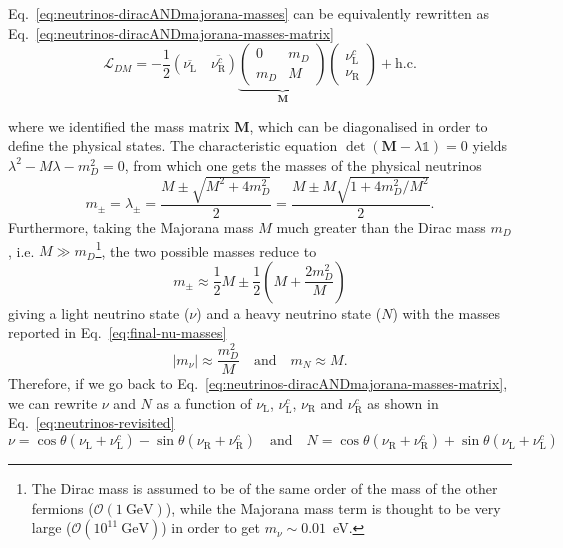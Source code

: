 Eq.~\ref{eq:neutrinos-diracANDmajorana-masses} can be equivalently rewritten as Eq.~\ref{eq:neutrinos-diracANDmajorana-masses-matrix}
\begin{equation}
    \label{eq:neutrinos-diracANDmajorana-masses-matrix}
    \mathcal{L}_{DM} = -\frac{1}{2} \left( \overline{\nu_\text{L}} \quad \overline{\nu_\text{R}^c} \right) \underbrace{\begin{pmatrix} 0 & m_D \\ m_D & M \end{pmatrix}}_{\mathbf{M}} \begin{pmatrix} \nu_\text{L}^c \\ \nu_\text{R} \end{pmatrix} + \text{h.c.}
\end{equation}

where we identified the mass matrix $\mathbf{M}$, which can be diagonalised in order to define the physical states. 
The characteristic equation $\det(\mathbf{M} - \lambda \mathbb{1}) = 0$ yields $\lambda^2 - M\lambda - m_D^2 = 0$, 
from which one gets the masses of the physical neutrinos 
\begin{equation*}
    m_{\pm} = \lambda_{\pm} = \frac{M \pm \sqrt{M^2 + 4m_D^2}}{2} = \frac{M \pm M\sqrt{1 + 4m_D^2/M^2}}{2}.
\end{equation*}
Furthermore, taking the Majorana mass $M$ much greater than the Dirac mass $m_D$, 
i.e. $M \gg m_D$\footnote{The Dirac mass is assumed to be of the same order of the mass of the other fermions ($\mathcal{O}(1~\text{GeV})$), 
while the Majorana mass term is thought to be very large ($\mathcal{O}(10^{11}~\text{GeV})$) in order to get $m_\nu \sim 0.01$~eV.}, 
the two possible masses reduce to 
\begin{equation*}
    m_{\pm} \approx \frac{1}{2}M \pm \frac{1}{2}\left( M + \frac{2m_D^2}{M} \right)
\end{equation*}
giving a light neutrino state ($\nu$) and a heavy neutrino state ($N$) with the masses reported in Eq.~\ref{eq:final-nu-masses}
\begin{equation}
    \label{eq:final-nu-masses}
    |m_{\nu}| \approx \frac{m_D^2}{M} \quad \text{and} \quad m_N \approx M.
\end{equation} 
Therefore, if we go back to Eq.~\ref{eq:neutrinos-diracANDmajorana-masses-matrix}, we can rewrite $\nu$ and $N$ as a function of
$\nu_\text{L}$, $\nu_\text{L}^c$, $\nu_\text{R}$ and $\nu_\text{R}^c$ as shown in Eq.~\ref{eq:neutrinos-revisited}
\begin{equation}
    \label{eq:neutrinos-revisited}
    \nu = \cos\theta (\nu_\text{L} + \nu_\text{L}^c) - \sin\theta (\nu_\text{R} + \nu_\text{R}^c) \quad \text{and} \quad N = \cos\theta (\nu_\text{R} + \nu_\text{R}^c) + \sin\theta (\nu_\text{L} + \nu_\text{L}^c)
\end{equation}

